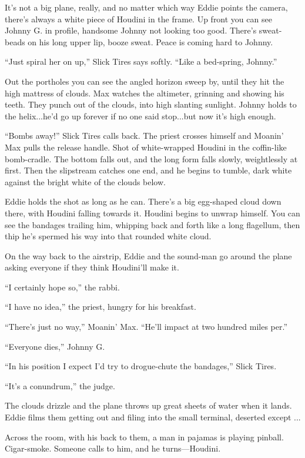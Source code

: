 It's not a big plane, really, and no matter which way Eddie points the camera, there's always a white piece of Houdini in the frame. Up front you can see Johnny G. in profile, handsome Johnny not looking too good. There's sweat-beads on his long upper lip, booze sweat. Peace is coming hard to Johnny.

``Just spiral her on up,'' Slick Tires says softly. ``Like a bed-spring, Johnny.''

Out the portholes you can see the angled horizon sweep by, until they hit the high mattress of clouds. Max watches the altimeter, grinning and showing his teeth. They punch out of the clouds, into high slanting sunlight. Johnny holds to the helix...he'd go up forever if no one said stop...but now it's high enough.

``Bombs away!'' Slick Tires calls back. The priest crosses himself and Moanin' Max pulls the release handle. Shot of white-wrapped Houdini in the coffin-like bomb-cradle. The bottom falls out, and the long form falls slowly, weightlessly at first. Then the slipstream catches one end, and he begins to tumble, dark white against the bright white of the clouds below.

Eddie holds the shot as long as he can. There's a big egg-shaped cloud down there, with Houdini falling towards it. Houdini begins to unwrap himself. You can see the bandages trailing him, whipping back and forth like a long flagellum, then thip he's spermed his way into that rounded white cloud.

On the way back to the airstrip, Eddie and the sound-man go around the plane asking everyone if they think Houdini'll make it.

``I certainly hope so,'' the rabbi.

``I have no idea,'' the priest, hungry for his breakfast.

``There's just no way,'' Moanin' Max. ``He'll impact at two hundred miles per.''

``Everyone dies,'' Johnny G.

``In his position I expect I'd try to drogue-chute the bandages,'' Slick Tires.

``It's a conundrum,'' the judge.

The clouds drizzle and the plane throws up great sheets of water when it lands. Eddie films them getting out and filing into the small terminal, deserted except ...

Across the room, with his back to them, a man in pajamas is playing pinball. Cigar-smoke. Someone calls to him, and he turns—Houdini.

